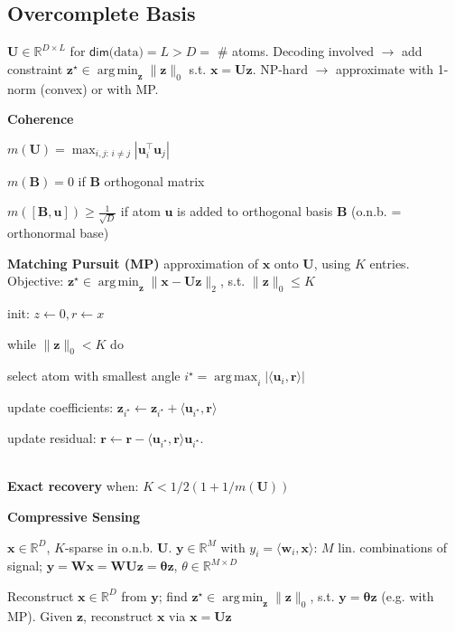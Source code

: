 \documentclass[a4paper, 11pt, landscape]{article}
\DeclareMathOperator*{\argmin}{arg\,min}
\DeclareMathOperator*{\argmax}{arg\,max}
\begin{document}
\begin{multicols*}{3}
\subsection{Overcomplete Basis}
$\mathbf{U} \in \mathbb{R}^{D \times  L}$ for $\mathsf{dim}\text{(data)} = L > D =$ \# atoms. Decoding involved $\rightarrow$ add constraint $\mathbf{z}^\star \in \argmin_\mathbf{z} \lVert \mathbf{z} \rVert_0$ s.t. $\mathbf{x} = \mathbf{Uz}$. NP-hard $\rightarrow$ approximate with 1-norm (convex) or with MP.

\textbf{Coherence}
\begin{inparaitem}[\color{red}\textbullet]
	\item $m(\mathbf{U}) = \max_{i,j:\, i \neq j} | \mathbf{u}_i^\top \mathbf{u}_j |$
	\item $m(\mathbf{B}) = 0$ if $\mathbf{B}$ orthogonal matrix
	\item $m([\mathbf{B}, \mathbf{u}]) \geq \frac{1}{\sqrt{D}}$ if atom $\mathbf{u}$ is added to orthogonal basis $\mathbf{B}$ (o.n.b. = orthonormal base)
\end{inparaitem}

\textbf{Matching Pursuit (MP)}
approximation of $\mathbf{x}$ onto $\mathbf{U}$, using $K$ entries.
Objective: $\mathbf{z}^\star \in \argmin_{\mathbf{z}} \|\mathbf{x} - \mathbf{Uz} \|_2$, s.t. $\|\mathbf{z}\|_0 \leq K$
\begin{inparaenum}
	\item init: $z \leftarrow 0, r \leftarrow x$
	\item while $\|\mathbf{z}\|_0 < K$ do
	\item select atom with smallest angle $i^\star = \argmax_i |\langle \mathbf{u}_i, \mathbf{r} \rangle|$
	\item update coefficients: $\mathbf{z}_{i^\star} \leftarrow \mathbf{z}_{i^\star} + \langle \mathbf{u}_{i^\star}, \mathbf{r} \rangle$
	\item update residual: $\mathbf{r} \leftarrow \mathbf{r} - \langle \mathbf{u}_{i^\star}, \mathbf{r} \rangle \mathbf{u}_{i^\star}$.
\end{inparaenum}
\\\textbf{Exact recovery} when: $K<1/2( 1+1/m(\mathbf{U}))$

\textbf{Compressive Sensing}
\begin{inparaitem}[\color{red}\textbullet]
  \item $\mathbf{x} \in \mathbb{R}^D$, $K$-sparse in o.n.b. $\mathbf{U}$. $\mathbf{y} \in \mathbb{R}^M$ with $y_i = \langle \mathbf{w}_i, \mathbf{x}\rangle $: $M$ lin. combinations of signal; $\mathbf{y} = \mathbf{Wx} = \mathbf{WUz} = \mathbf{\theta z}$, $\theta \in \mathbb{R}^{M \times D}$
  \item Reconstruct $\mathbf{x} \in \mathbb{R}^D$ from $\mathbf{y}$; find $\mathbf{z}^\star \in \argmin_{\mathbf{z}}\|\mathbf{z}\|_0$, s.t. $\mathbf{y} = \mathbf{\theta z}$ (e.g. with MP). Given $\mathbf{z}$, reconstruct $\mathbf{x}$ via $\mathbf{x} = \mathbf{Uz}$
\end{inparaitem}


\end{multicols*}
\end{document}

